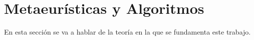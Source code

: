 \section{Metaeurísticas y Algoritmos}
En esta sección se va a hablar de la teoría en la que se fundamenta este trabajo. \linebreak
